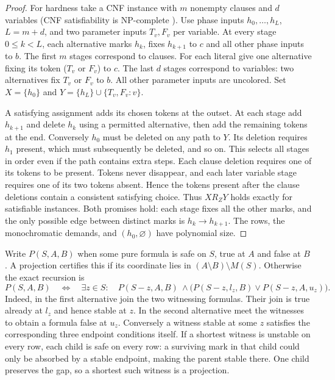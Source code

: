 \begin{proof}
For hardness take a CNF instance with $m$ nonempty clauses and $d$
variables (CNF satisfiability is NP-complete \cite{Cook1971}). Use
phase inputs $h_0,\ldots,h_L$, $L=m+d$, and two parameter inputs
$T_v,F_v$ per variable. At every stage $0\le k<L$, each alternative
marks $h_k$, fixes $h_{k+1}$ to $c$ and all other phase inputs to $b$.
The first $m$ stages correspond to clauses. For each literal give one
alternative fixing its token ($T_v$ or $F_v$) to $c$. The last $d$
stages correspond to variables: two alternatives fix $T_v$ or $F_v$
to $b$. All other parameter inputs are uncolored. Set
$X=\{h_0\}$ and $Y=\{h_L\}\cup\{T_v,F_v:v\}$.

A satisfying assignment adds its chosen tokens at the outset. At each
stage add $h_{k+1}$ and delete $h_k$ using a permitted alternative,
then add the remaining tokens at the end. Conversely $h_0$ must be
deleted on any path to $Y$. Its deletion requires $h_1$ present, which
must subsequently be deleted, and so on. This selects all stages in
order even if the path contains extra steps. Each clause deletion requires one of its tokens to be present. Tokens never disappear, and each later
variable stage requires one of its two tokens absent. Hence the tokens
present after the clause deletions contain a consistent satisfying
choice. Thus $X\mathrel{R_Z}Y$ holds exactly for satisfiable instances.
Both promises hold: each stage fixes all the other marks, and the only
possible edge between distinct marks is $h_k\to h_{k+1}$. The rows,
the monochromatic demands, and $(h_0,\varnothing)$ have polynomial size.
\end{proof}

Write $P(S,A,B)$ when some pure formula is safe on $S$, true at $A$ and false at $B$.
A projection certifies this if its coordinate lies in $(A\setminus B)\setminus M(S)$.
Otherwise the exact recursion is
\[
 P(S,A,B)\quad\Longleftrightarrow\quad
 \exists z\in S:\quad P(S-z,A,B)\ \land \bigl(P(S-z,l_z,B)\lor P(S-z,A,u_z)\bigr).
\]
Indeed, in the first alternative join the two witnessing formulas. Their join
is true already at $l_z$ and hence stable at $z$. In the second alternative
meet the witnesses to obtain a formula false at $u_z$. Conversely a witness
stable at some $z$ satisfies the corresponding three endpoint conditions
itself. If a shortest witness is unstable on every row, each child is safe
on every row: a surviving mark in that child could only be absorbed by a
stable endpoint, making the parent stable there. One child preserves the
gap, so a shortest such witness is a projection.

